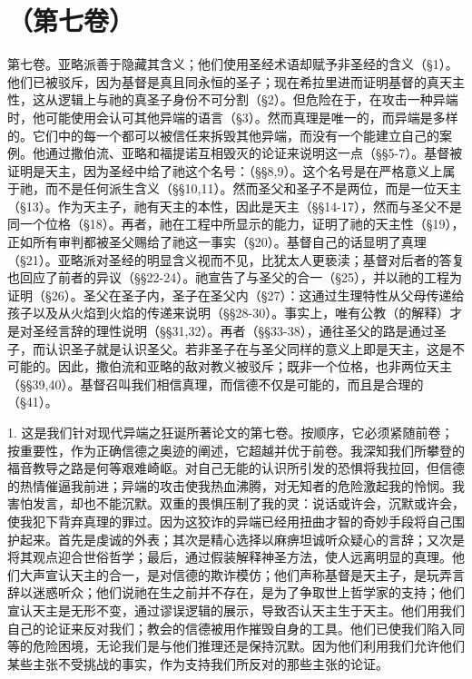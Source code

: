 

\section{（第七卷）}

第七卷。亚略派善于隐藏其含义；他们使用圣经术语却赋予非圣经的含义（§1）。他们已被驳斥，因为基督是真且同永恒的圣子；现在希拉里进而证明基督的真天主性，这从逻辑上与祂的真圣子身份不可分割（§2）。但危险在于，在攻击一种异端时，他可能使用会认可其他异端的语言（§3）。然而真理是唯一的，而异端是多样的。它们中的每一个都可以被信任来拆毁其他异端，而没有一个能建立自己的案例。他通过撒伯流、亚略和福提诺互相毁灭的论证来说明这一点（§§5-7）。基督被证明是天主，因为圣经中给了祂这个名号：（§§8,9）。这个名号是在严格意义上属于祂，而不是任何派生含义（§§10,11）。然而圣父和圣子不是两位，而是一位天主（§13）。作为天主子，祂有天主的本性，因此是天主（§§14-17），然而与圣父不是同一个位格（§18）。再者，祂在工程中所显示的能力，证明了祂的天主性（§19），正如所有审判都被圣父赐给了祂这一事实（§20）。基督自己的话显明了真理（§21）。亚略派对圣经的明显含义视而不见，比犹太人更亵渎；基督对后者的答复也回应了前者的异议（§§22-24）。祂宣告了与圣父的合一（§25），并以祂的工程为证明（§26）。圣父在圣子内，圣子在圣父内（§27）：这通过生理特性从父母传递给孩子以及从火焰到火焰的传递来说明（§§28-30）。事实上，唯有公教（的解释）才是对圣经言辞的理性说明（§§31,32）。再者（§§33-38），通往圣父的路是通过圣子，而认识圣子就是认识圣父。若非圣子在与圣父同样的意义上即是天主，这是不可能的。因此，撒伯流和亚略的敌对教义被驳斥；既非一个位格，也非两位天主（§§39,40）。基督召叫我们相信真理，而信德不仅是可能的，而且是合理的（§41）。\par

1. 这是我们针对现代异端之狂诞所著论文的第七卷。按顺序，它必须紧随前卷；按重要性，作为正确信德之奥迹的阐述，它超越并优于前卷。我深知我们所攀登的福音教导之路是何等艰难崎岖。对自己无能的认识所引发的恐惧将我拉回，但信德的热情催逼我前进；异端的攻击使我热血沸腾，对无知者的危险激起我的怜悯。我害怕发言，却也不能沉默。双重的畏惧压制了我的灵：说话或许会，沉默或许会，使我犯下背弃真理的罪过。因为这狡诈的异端已经用扭曲才智的奇妙手段将自己围护起来。首先是虔诚的外表；其次是精心选择以麻痹坦诚听众疑心的言辞；又次是将其观点迎合世俗哲学；最后，通过假装解释神圣方法，使人远离明显的真理。他们大声宣认天主的合一，是对信德的欺诈模仿；他们声称基督是天主子，是玩弄言辞以迷惑听众；他们说祂在生之前并不存在，是为了争取世上哲学家的支持；他们宣认天主是无形不变，通过谬误逻辑的展示，导致否认天主生于天主。他们用我们自己的论证来反对我们；教会的信德被用作摧毁自身的工具。他们已使我们陷入同等的危险困境，无论我们是与他们推理还是保持沉默。因为他们利用我们允许他们某些主张不受挑战的事实，作为支持我们所反对的那些主张的论证。\par


